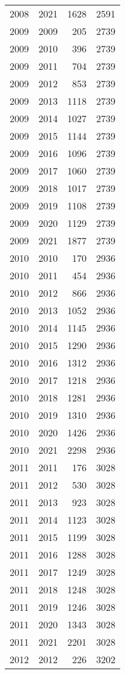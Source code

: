 \documentclass[
  10pt,
  letterpaper,
  DIV=11,
  numbers=noendperiod,
  twoside]{scrartcl}
\begin{document}
\begin{longtable}[]{@{}rrrr@{}}
2008 & 2021 & 1628 & 2591 \\
2009 & 2009 & 205 & 2739 \\
2009 & 2010 & 396 & 2739 \\
2009 & 2011 & 704 & 2739 \\
2009 & 2012 & 853 & 2739 \\
2009 & 2013 & 1118 & 2739 \\
2009 & 2014 & 1027 & 2739 \\
2009 & 2015 & 1144 & 2739 \\
2009 & 2016 & 1096 & 2739 \\
2009 & 2017 & 1060 & 2739 \\
2009 & 2018 & 1017 & 2739 \\
2009 & 2019 & 1108 & 2739 \\
2009 & 2020 & 1129 & 2739 \\
2009 & 2021 & 1877 & 2739 \\
2010 & 2010 & 170 & 2936 \\
2010 & 2011 & 454 & 2936 \\
2010 & 2012 & 866 & 2936 \\
2010 & 2013 & 1052 & 2936 \\
2010 & 2014 & 1145 & 2936 \\
2010 & 2015 & 1290 & 2936 \\
2010 & 2016 & 1312 & 2936 \\
2010 & 2017 & 1218 & 2936 \\
2010 & 2018 & 1281 & 2936 \\
2010 & 2019 & 1310 & 2936 \\
2010 & 2020 & 1426 & 2936 \\
2010 & 2021 & 2298 & 2936 \\
2011 & 2011 & 176 & 3028 \\
2011 & 2012 & 530 & 3028 \\
2011 & 2013 & 923 & 3028 \\
2011 & 2014 & 1123 & 3028 \\
2011 & 2015 & 1199 & 3028 \\
2011 & 2016 & 1288 & 3028 \\
2011 & 2017 & 1249 & 3028 \\
2011 & 2018 & 1248 & 3028 \\
2011 & 2019 & 1246 & 3028 \\
2011 & 2020 & 1343 & 3028 \\
2011 & 2021 & 2201 & 3028 \\
2012 & 2012 & 226 & 3202 \\

\end{longtable}
\end{document}
